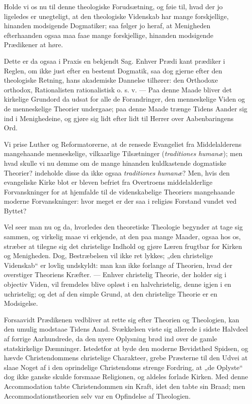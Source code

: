 \documentclass[12pt,a4paper]{book}
\newcommand{\opage}[1]{\marginnote{\footnotesize\textit{[#1]}}}
\begin{document}
Holde vi os nu til denne theologiske Forudsætning, og føie til, hvad der jo
ligeledes er unegteligt, at den theologiske Videnskab har mange
forskjellige, hinanden modsigende Dogmatiker; saa følger jo heraf, at
Menigheden efterhaanden ogsaa maa faae mange forskjellige, hinanden
modsigende Prædikener at høre.

Dette er da ogsaa i Praxis en bekjendt Sag. Enhver Prædi\-%
\opage{142}kant prædiker i Reglen, om ikke just efter en bestemt Dogmatik, saa dog
gjerne efter den theologiske Retning, hans akademiske Dannelse tilhører:
den Orthodoxe orthodox, Rationalisten rationalistisk o. s. v. --- Paa denne
Maade bliver det kirkelige Grundord da udsat for alle de Forandringer, den
menneskelige Viden og de menneskelige Theorier undergaae; paa denne Maade
trænge Tidens Aander sig ind i Menighedeine, og gjøre sig lidt efter lidt
til Herrer over Aabenbaringens Ord.

Vi prise Luther og Reformatorerne, at de rensede Evangeliet fra
Middelalderens mangehaande menneskelige, vilkaarlige Tilsætninger
(\textit{traditiones humanæ}); men hvad skulle vi nu dømme om de mange
hinanden kuldkastende dogmatiske Theorier? indeholde disse da ikke ogsaa
\textit{traditiones humanæ}? Men, hvis den evangeliske Kirke blot er bleven
befriet fra Overtroens middelalderlige Forvanskninger for at hjemfalde til
de videnskabelige Theoriers mangehaande moderne Forvanskninger: hvor meget
er der saa i religiøs Forstand vundet ved Byttet?

Vel seer man nu og da, hvorledes den theoretiske Theologie begynder at tage
sig sammen, og virkelig maae vi erkjende, at den paa mange Maader, ogsaa
hos os, stræber at tilegne sig det christelige Indhold og gjøre Læren
frugtbar for Kirken og Menigheden. Dog, Bestræbelsen vil ikke ret lykkes;
„den christelige Videnskab“ er lovlig undskyldt: man kan ikke forlange af
Theorien, hvad der overstiger Theoriens Kræfter. --- Enhver christelig
Theorie, der holder sig i objectiv Viden, vil fremdeles blive opløst i en
halvchristelig, denne igjen i en uchristelig; og det af den simple Grund,
at den christelige Theorie er en Modsigelse.

Forsaavidt Prædikenen vedbliver at rette sig efter Theorien og Theologien,
kan den umulig modstaae Tidens Aand. Svækkelsen viste sig allerede i sidste
Halvdeel af forrige Aarhundrede, da den nyere Oplysning brød ind over de
gamle statskirkelige Dæmninger. Istedetfor at byde den moderne Bevidsthed
Spidsen,
\opage{143} og hævde Christendommens christelige Charakteer, grebe Præsterne til den
Udvei at slaae Noget af i den oprindelige Christendoms strenge Fordring, at
„de Oplyste“ dog ikke ganske skulde forsmaae Religionen, og aldeles forlade
Kirken. Med denne Accommodation tabte Christendommen sin Kraft, idet den
tabte sin Braad; men Accommodationstheorien selv var en Opfindelse af
Theologien.
\end{document}
